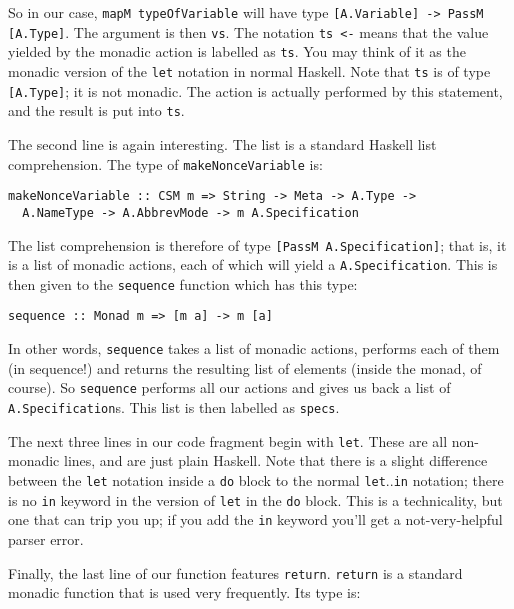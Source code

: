 \documentclass[a4wide]{article}
\begin{document}
So in our case, \lstinline|mapM typeOfVariable| will have type \lstinline|[A.Variable] -> PassM [A.Type]|.
The argument is then \lstinline|vs|.  The notation \lstinline|ts <-| means that the value yielded
by the monadic action is labelled as \lstinline|ts|.  You may think of it as the monadic version of the
\lstinline|let| notation in normal Haskell.  Note that \lstinline|ts| is of type \lstinline|[A.Type]|; it
is not monadic.  The action is actually performed by this statement, and the result is put into \lstinline|ts|.

The second line is again interesting.  The list is a standard Haskell list comprehension.  The type of
\lstinline|makeNonceVariable| is:

\begin{lstlisting}
makeNonceVariable :: CSM m => String -> Meta -> A.Type ->
  A.NameType -> A.AbbrevMode -> m A.Specification
\end{lstlisting}

The list comprehension is therefore of type \lstinline|[PassM A.Specification]|; that is, it is a list
of monadic actions, each of which will yield a \lstinline|A.Specification|.  This is then given to the \lstinline|sequence| function
which has this type:

\begin{lstlisting}
sequence :: Monad m => [m a] -> m [a]
\end{lstlisting}

In other words, \lstinline|sequence| takes a list of monadic actions, performs each of them (in sequence!) and returns
the resulting list of elements (inside the monad, of course).  So \lstinline|sequence| performs all our actions and gives
us back a list of \lstinline|A.Specification|s.  This list is then labelled as \lstinline|specs|.

The next three lines in our code fragment begin with \lstinline|let|.  These are all non-monadic lines, and
are just plain Haskell.  Note that there is a slight difference between the \lstinline|let| notation inside
a \lstinline|do| block to the normal \lstinline|let|..\lstinline|in| notation; there is no \lstinline|in|
keyword in the version of \lstinline|let| in the \lstinline|do| block.  This is a technicality, but one that can trip you up;
if you add the \lstinline|in| keyword you'll get a not-very-helpful parser error.

Finally, the last line of our function features \lstinline|return|.  \lstinline|return| is a standard monadic
function that is used very frequently.  Its type is:
\end{document}
